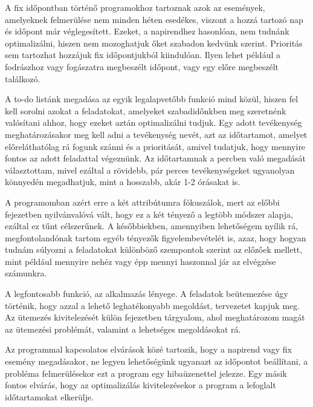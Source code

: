 
A fix időpontban történő programokhoz tartoznak azok az események, amelyeknek felmerülése nem minden héten esedékes, viszont a hozzá tartozó nap és időpont már véglegesített. Ezeket, a napirendhez hasonlóan, nem tudnánk optimalizálni, hiszen nem mozoghatjuk őket szabadon kedvünk szerint. Prioritás sem tartozhat hozzájuk fix időpontjukból kiindulóan. Ilyen lehet például a fodrászhoz vagy fogászatra megbeszélt időpont, vagy egy előre megbeszélt találkozó.


A to-do listánk megadása az egyik legalapvetőbb funkció mind közül, hiszen fel kell sorolni azokat a feladatokat, amelyeket szabadidőnkben meg szeretnénk valósítani ahhoz, hogy ezeket aztán optimalizálni tudjuk. Egy adott tevékenység meghatározásakor meg kell adni a tevékenység nevét, azt az időtartamot, amelyet előreláthatólag rá fogunk szánni és a prioritását, amivel tudatjuk, hogy mennyire fontos az adott feladattal végeznünk. Az időtartamnak a percben való megadását választottam, mivel ezáltal a rövidebb, pár perces tevékenységeket ugyanolyan könnyedén megadhatjuk, mint a hosszabb, akár 1-2 órásakat is.


A programomban azért erre a két attribútumra fókuszálok, mert az előbbi fejezetben nyilvánvalóvá vált, hogy ez a két tényező a legtöbb módszer alapja, ezáltal ez tűnt célszerűnek. A későbbiekben, amennyiben lehetőségem nyílik rá, megfontolandónak tartom egyéb tényezők figyelembevételét is, azaz, hogy hogyan tudnám súlyozni a feladatokat különböző szempontok szerint az előzőek mellett, mint például mennyire nehéz vagy épp mennyi haszonnal jár az elvégzése számunkra.


A legfontosabb funkció, az alkalmazás lényege. A feladatok beütemezése úgy történik, hogy azzal a lehető leghatékonyabb megoldást, tervezetet kapjuk meg. Az ütemezés kivitelezését külön fejezetben tárgyalom, ahol meghatározom magát az ütemezési problémát, valamint a lehetséges megoldásokat rá.

Az programmal kapcsolatos elvárások közé tartozik, hogy a napirend vagy fix esemény megadásakor, ne legyen lehetőségünk ugyanazt az időpontot beállítani, a probléma felmerülésekor ezt a program egy hibaüzenettel jelezze. Egy másik fontos elvárás, hogy az optimalizálás kivitelezésekor a program a lefoglalt időtartamokat elkerülje.

